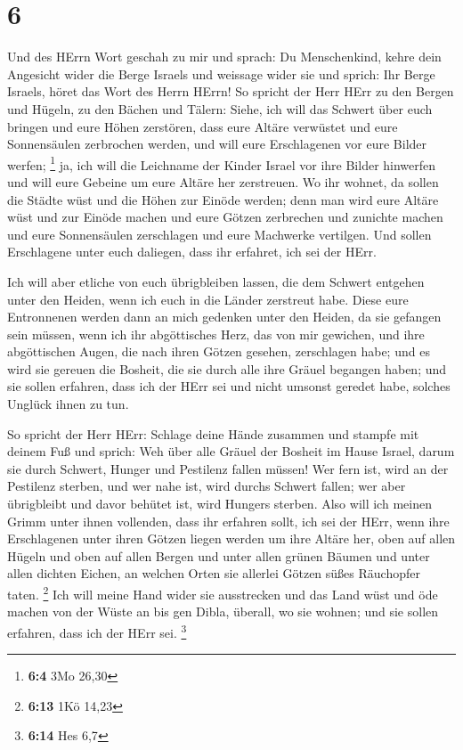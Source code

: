 \hypertarget{section-2}{%
\section{6}\label{section-2}}

 Und des HErrn Wort geschah zu mir und sprach: 
Du Menschenkind, kehre dein Angesicht wider die Berge Israels und
weissage wider sie  und sprich: Ihr Berge Israels, höret das
Wort des Herrn HErrn! So spricht der Herr HErr zu den Bergen und Hügeln,
zu den Bächen und Tälern: Siehe, ich will das Schwert über euch bringen
und eure Höhen zerstören,  dass eure Altäre verwüstet und
eure Sonnensäulen zerbrochen werden, und will eure Erschlagenen vor eure
Bilder werfen; \footnote{\textbf{6:4} 3Mo 26,30}  ja, ich
will die Leichname der Kinder Israel vor ihre Bilder hinwerfen und will
eure Gebeine um eure Altäre her zerstreuen.  Wo ihr wohnet,
da sollen die Städte wüst und die Höhen zur Einöde werden; denn man wird
eure Altäre wüst und zur Einöde machen und eure Götzen zerbrechen und
zunichte machen und eure Sonnensäulen zerschlagen und eure Machwerke
vertilgen.  Und sollen Erschlagene unter euch daliegen, dass
ihr erfahret, ich sei der HErr.

 Ich will aber etliche von euch übrigbleiben lassen, die dem
Schwert entgehen unter den Heiden, wenn ich euch in die Länder zerstreut
habe.  Diese eure Entronnenen werden dann an mich gedenken
unter den Heiden, da sie gefangen sein müssen, wenn ich ihr abgöttisches
Herz, das von mir gewichen, und ihre abgöttischen Augen, die nach ihren
Götzen gesehen, zerschlagen habe; und es wird sie gereuen die Bosheit,
die sie durch alle ihre Gräuel begangen haben;  und sie
sollen erfahren, dass ich der HErr sei und nicht umsonst geredet habe,
solches Unglück ihnen zu tun.

 So spricht der Herr HErr: Schlage deine Hände zusammen und
stampfe mit deinem Fuß und sprich: Weh über alle Gräuel der Bosheit im
Hause Israel, darum sie durch Schwert, Hunger und Pestilenz fallen
müssen!  Wer fern ist, wird an der Pestilenz sterben, und
wer nahe ist, wird durchs Schwert fallen; wer aber übrigbleibt und davor
behütet ist, wird Hungers sterben. Also will ich meinen Grimm unter
ihnen vollenden,  dass ihr erfahren sollt, ich sei der
HErr, wenn ihre Erschlagenen unter ihren Götzen liegen werden um ihre
Altäre her, oben auf allen Hügeln und oben auf allen Bergen und unter
allen grünen Bäumen und unter allen dichten Eichen, an welchen Orten sie
allerlei Götzen süßes Räuchopfer taten. \footnote{\textbf{6:13} 1Kö
  14,23}  Ich will meine Hand wider sie ausstrecken und das
Land wüst und öde machen von der Wüste an bis gen Dibla, überall, wo sie
wohnen; und sie sollen erfahren, dass ich der HErr sei. \footnote{\textbf{6:14}
  Hes 6,7}

